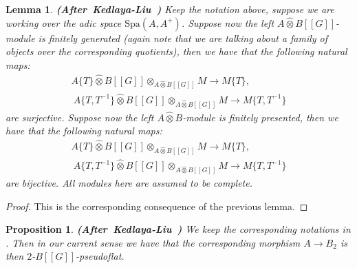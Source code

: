 \documentclass[12pt]{amsart}
\newtheorem{lemma}[theorem]{Lemma}
\newtheorem{proposition}[theorem]{Proposition}
\theoremstyle{definition}
\numberwithin{equation}{section}
\begin{document}
\begin{lemma} \mbox{\bf{(After Kedlaya-Liu \cite[Corollary 2.4.9]{KL2})}}
Keep the notation above, suppose we are working over the adic space $
\mathrm{Spa}(A,A^+)$. Suppose now the left $A\widehat{\otimes}B[[G]]$-module is finitely generated (again note that we are talking about a family of objects over the corresponding quotients), then we have that the following natural maps:
\begin{align}
A\{T\}\widehat{\otimes}B[[G]]\otimes_{A\widehat{\otimes}B[[G]]}M 	\rightarrow M\{T\},\\\
A\{T,T^{-1}\}\widehat{\otimes}B[[G]] \otimes_{A\widehat{\otimes}B[[G]]} M	\rightarrow M\{T,T^{-1}\}	
\end{align}
are surjective. Suppose now the left $A\widehat{\otimes}B$-module is finitely presented, then we have that the following natural maps:
\begin{align}
A\{T\}\widehat{\otimes}B[[G]]\otimes_{A\widehat{\otimes}B[[G]]}M 	\rightarrow M\{T\},\\\
A\{T,T^{-1}\}\widehat{\otimes}B[[G]] \otimes_{A\widehat{\otimes}B[[G]]} M	\rightarrow M\{T,T^{-1}\}	
\end{align}
are bijective. All modules here are assumed to be complete.


\end{lemma}


\begin{proof}
This is the corresponding consequence of the previous lemma.
\end{proof}






\begin{proposition} \mbox{\bf{(After Kedlaya-Liu \cite[Lemma 2.4.12]{KL2})}}
We keep the corresponding notations in \cite[Lemma 2.4.10]{KL2}. Then in our current sense we have that the corresponding morphism $A\rightarrow B_2$ is then $2$-$B[[G]]$-pseudoflat. 
\end{proposition}
\end{document}
